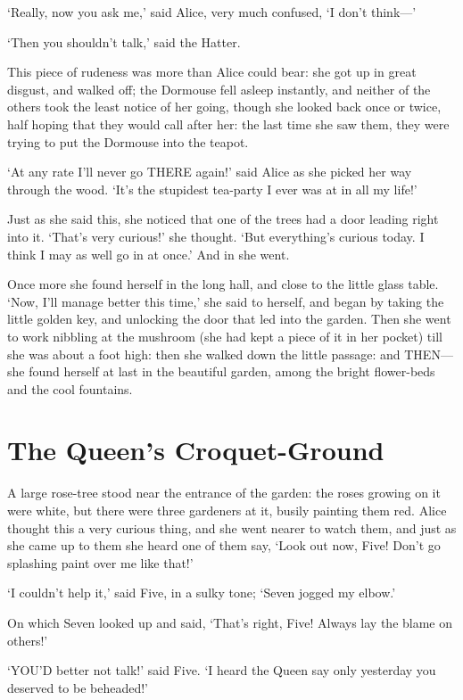 \documentclass[12pt]{book}
\begin{document}
\begin{Parallel}[p]{}{}
{‘Really, now you ask me,’ said Alice, very much confused, ‘I don’t think—’

‘Then you shouldn’t talk,’ said the Hatter.

This piece of rudeness was more than Alice could bear: she got up in great disgust, and walked off; the Dormouse fell asleep instantly, and neither of the others took the least notice of her going, though she looked back once or twice, half hoping that they would call after her: the last time she saw them, they were trying to put the Dormouse into the teapot.

‘At any rate I’ll never go THERE again!’ said Alice as she picked her way through the wood. ‘It’s the stupidest tea-party I ever was at in all my life!’

Just as she said this, she noticed that one of the trees had a door leading right into it. ‘That’s very curious!’ she thought. ‘But everything’s curious today. I think I may as well go in at once.’ And in she went.

Once more she found herself in the long hall, and close to the little glass table. ‘Now, I’ll manage better this time,’ she said to herself, and began by taking the little golden key, and unlocking the door that led into the garden. Then she went to work nibbling at the mushroom (she had kept a piece of it in her pocket) till she was about a foot high: then she walked down the little passage: and THEN—she found herself at last in the beautiful garden, among the bright flower-beds and the cool fountains.




\section{The Queen’s Croquet-Ground}

A large rose-tree stood near the entrance of the garden: the roses growing on it were white, but there were three gardeners at it, busily painting them red. Alice thought this a very curious thing, and she went nearer to watch them, and just as she came up to them she heard one of them say, ‘Look out now, Five! Don’t go splashing paint over me like that!’

‘I couldn’t help it,’ said Five, in a sulky tone; ‘Seven jogged my elbow.’

On which Seven looked up and said, ‘That’s right, Five! Always lay the blame on others!’

‘YOU’D better not talk!’ said Five. ‘I heard the Queen say only yesterday you deserved to be beheaded!’

}
\end{Parallel}
\end{document}
